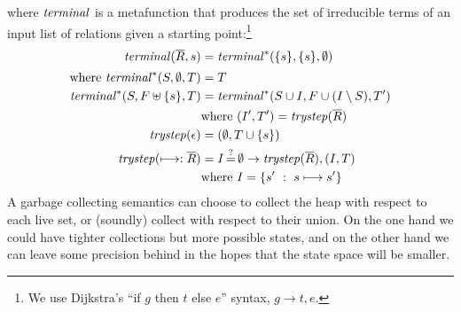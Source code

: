 where $\mathit{terminal}$ is a metafunction that produces the set of irreducible terms of an input list of relations given a starting point:\footnote{We use Dijkstra's ``if $g$ then $t$ else $e$'' syntax, $g \to t, e$.}
\begin{align*}
  \mathit{terminal}(\overline{R},s) &= \mathit{terminal}^*(\{ s \},\{ s \},\emptyset) \\[2pt]
  \text{where } \mathit{terminal}^*(S, \emptyset, T) &= T \\
   \mathit{terminal}^*(S, F \uplus \{ s \}, T) &= \mathit{terminal}^*(S\cup I, F \cup (I \setminus S), T') \\
   & \text{where } (I',T') = \mathit{trystep}(\overline{R}) \\
   \mathit{trystep}(\epsilon) &= (\emptyset,T\cup\{ s \}) \\
   \mathit{trystep}(\longmapsto:\overline{R}) &= I\operatorname*{\overset{?}{=}}\emptyset \to \mathit{trystep}(\overline{R}), (I, T) \\
    & \text{where } I = \{ s'\ :\ s \longmapsto s'\}
\end{align*}
%
A garbage collecting semantics can choose to collect the heap with respect to each live set, or (soundly) collect with respect to their union.
%
On the one hand we could have tighter collections but more possible states, and on the other hand we can leave some precision behind in the hopes that the state space will be smaller.
%
